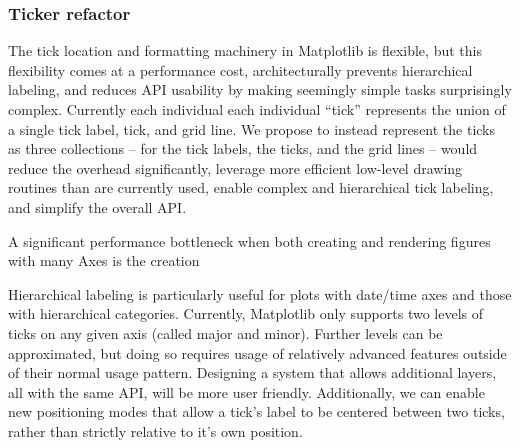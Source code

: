 \documentclass[12pt]{article}
\numberwithin{page}{section}
\begin{document}
%




%
%
%


\subsubsection{Ticker refactor}

The tick location and formatting machinery in Matplotlib is flexible, but this
flexibility comes at a performance cost, architecturally prevents hierarchical
labeling, and reduces API usability by making seemingly simple tasks
surprisingly complex.  Currently each individual each individual ``tick''
represents the union of a single tick label, tick, and grid line.  We propose to instead
represent the ticks as three collections  -- for the tick labels, the ticks, and
the grid lines -- would reduce the overhead significantly,  leverage more
efficient low-level drawing routines than are currently used, enable complex and hierarchical
tick labeling, and simplify the overall API.

A significant performance bottleneck when both creating and rendering figures with many Axes
is the creation

Hierarchical labeling is particularly useful for plots with date/time axes and those with
hierarchical categories.
Currently, Matplotlib only supports two levels of ticks on any given axis (called major
and minor).
Further levels can be approximated, but doing so requires usage of relatively advanced
features outside of their normal usage pattern.
Designing a system that allows additional layers, all with the same API, will be more
user friendly.
Additionally, we can enable new positioning modes that allow a tick's label to be
centered between two ticks, rather than strictly relative to it's own position.
\end{document}
